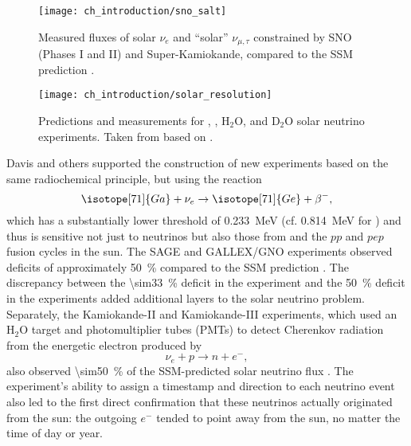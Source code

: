 \begin{figure}
    \centering
    \texttt{[image: ch\_introduction/sno\_salt]}
    \caption{
        Measured fluxes of solar $\nu_e$ and ``solar'' $\nu_{\mu,\tau}$
        constrained by SNO (Phases I and II) and Super-Kamiokande,
        compared to the SSM prediction \cite{sno_salt2004}.
    }
    \label{fig:sno_plots}
\end{figure}

\begin{figure}
    \centering
    \texttt{[image: ch\_introduction/solar\_resolution]}
    \caption{
        Predictions and measurements for , ,
        $\text{H}_2\text{O}$, and $\text{D}_2\text{O}$ solar neutrino experiments.
        Taken from \cite{bahcall_images} based on \cite{bahcall2005_diagram}.
    }
    \label{fig:solar_neutrino_fixed}
\end{figure}

Davis and others supported the construction of
new experiments based on the same radiochemical principle,
but using the reaction
\begin{equation}\label{eq:gallium}
    \isotope[71]{Ga} + \nu_e \to \isotope[71]{Ge} + \beta^-,
\end{equation}
which has a substantially lower threshold
of \SI{0.233}{\MeV} (cf. \SI{0.814}{\MeV} for )
and thus is sensitive not just to  neutrinos
but also those from  and the $pp$ and $pep$ fusion cycles in the sun.
The SAGE and GALLEX/GNO experiments observed deficits of approximately \SI{50}{\percent}
compared to the SSM prediction \cite{sage,gallex}.
The discrepancy between the \SI{\sim33}{\percent} deficit
in the  experiment
and the \SI{50}{\percent} deficit in the  experiments
added additional layers to the solar neutrino problem.
Separately, the Kamiokande-II and Kamiokande-III experiments,
which used an $\text{H}_2\text{O}$ target
and photomultiplier tubes (PMTs)
to detect Cherenkov radiation from the energetic electron produced by
\begin{equation}\label{eq:kamiokande}
    \nu_e + p \to n + e^-,
\end{equation}
also observed \SI{\sim50}{\percent} of the SSM-predicted solar neutrino flux
\cite{kamiokande_III}.
The experiment's ability to assign a timestamp and direction to each neutrino event
also led to the first direct confirmation that these neutrinos
actually originated from the sun:
the outgoing $e^-$ tended to point away from the sun,
no matter the time of day or year.


